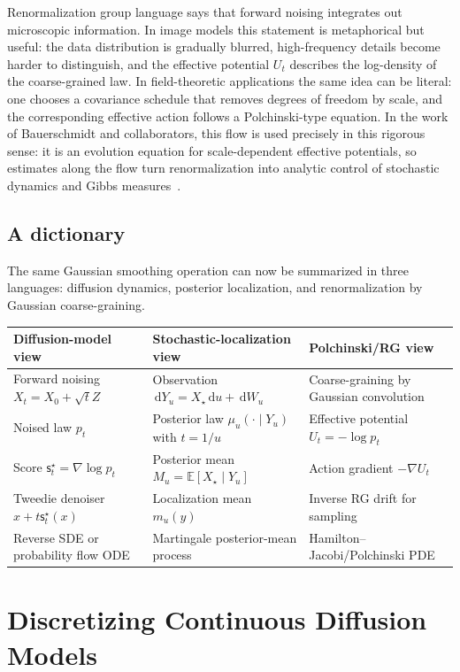 \documentclass{amsart}
\numberwithin{equation}{section}
\theoremstyle{plain}
\theoremstyle{definition}
\theoremstyle{remark}
\newcommand{\E}{\mathbb{E}}
\newcommand{\dd}{\,\mathrm{d}}
\newcommand{\sstar}{\mathsf{s}^{\star}}
\begin{document}
Renormalization group language says that forward noising integrates out
microscopic information.  In image models this statement is metaphorical but
useful: the data distribution is gradually blurred, high-frequency details
become harder to distinguish, and the effective potential $U_t$ describes
the log-density of the coarse-grained law.  In field-theoretic applications the
same idea can be literal: one chooses a covariance schedule that removes
degrees of freedom by scale, and the corresponding effective action follows a
Polchinski-type equation.
In the work of Bauerschmidt and collaborators, this flow is used precisely in
this rigorous sense: it is an evolution equation for scale-dependent effective
potentials, so estimates along the flow turn renormalization into analytic
control of stochastic dynamics and Gibbs measures~\cite{bauerschmidt2024polchinski}.


\subsection{A dictionary}

The same Gaussian smoothing operation can now be summarized in three languages:
diffusion dynamics, posterior localization, and renormalization by Gaussian
coarse-graining.
\begin{center}
\small
\begin{tabular}{p{}|p{}|p{}}
Diffusion-model view & Stochastic-localization view & Polchinski/RG view\\
\hline
Forward noising $X_t=X_0+\sqrt{t}Z$ &
Observation $\dd Y_u=X_\star\dd u+\dd W_u$ &
Coarse-graining by Gaussian convolution\\
Noised law $p_t$ &
Posterior law $\mu_u(\cdot\mid Y_u)$ with $t=1/u$ &
Effective potential $U_t=-\log p_t$\\
Score $\sstar_t=\nabla\log p_t$ &
Posterior mean $M_u=\E[X_\star\mid Y_u]$ &
Action gradient $-\nabla U_t$\\
Tweedie denoiser $x+t\sstar_t(x)$ &
Localization mean $m_u(y)$ &
Inverse RG drift for sampling\\
Reverse SDE or probability flow ODE &
Martingale posterior-mean process &
Hamilton--Jacobi/Polchinski PDE\\
\end{tabular}
\end{center}

\section{Discretizing Continuous Diffusion Models}\label{sec:discretizing}
\end{document}
